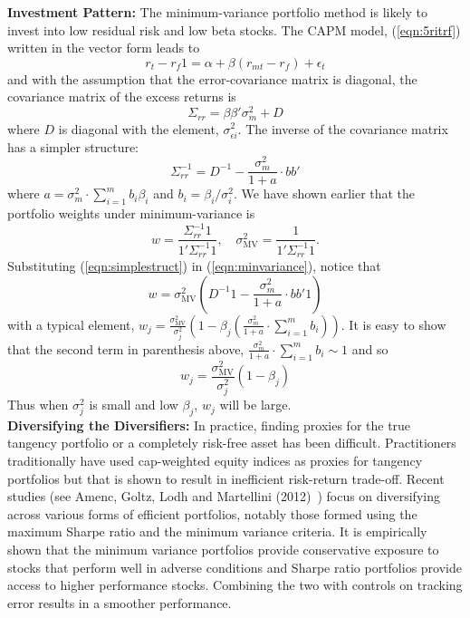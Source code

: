 \noindent \textbf{Investment Pattern:} The minimum-variance portfolio method is likely to invest into low residual risk and low beta stocks. The CAPM model, (\ref{eqn:5ritrf}) written in the vector form leads to
	\begin{equation}\label{eqn:vectorform}
	r_t - r_f 1 = \alpha + \beta(r_{mt} - r_f) + \epsilon_t
	\end{equation}
and with the assumption that the error-covariance matrix is diagonal, the covariance matrix of the excess returns is
	\begin{equation}\label{eqn:Sigmarr}
	\Sigma_{rr}= \beta\beta' \sigma_m^2 + D
	\end{equation}	
where $D$ is diagonal with the element, $\sigma_{\epsilon i}^2$. The inverse of the covariance matrix has a simpler structure:
	\begin{equation}\label{eqn:simplestruct}
	\Sigma_{rr}^{-1}= D^{-1} - \dfrac{\sigma_m^2}{1+a} \cdot bb'
	\end{equation}	
where $a=\sigma_m^2 \cdot \sum_{i=1}^m b_i \beta_i$ and $b_i= \beta_i/\sigma_i^2$. We have shown earlier that the portfolio weights under minimum-variance is
	\begin{equation} \label{eqn:minvariance}
	w= \dfrac{\Sigma_{rr}^{-1} 1}{1' \Sigma_{rr}^{-1} 1}, \quad \sigma_{\text{MV}}^2= \dfrac{1}{1' \Sigma_{rr}^{-1} 1}.
	\end{equation}	
Substituting (\ref{eqn:simplestruct}) in (\ref{eqn:minvariance}), notice that 
	\begin{equation}\label{eqn:wsubtitute}
	w= \sigma_{\text{MV}}^2 \left( D^{-1} 1 - \dfrac{\sigma_m^2}{1+a} \cdot bb' 1\right)
	\end{equation}
with a typical element, $w_j= \frac{\sigma_{\text{MV}}^2}{\sigma_j^2} \left(1 - \beta_j \left(\frac{\sigma_m^2}{1+a} \cdot \sum_{i=1}^m b_i \right)\right)$. It is easy to show that the second term in parenthesis above, $\frac{\sigma_m^2}{1+a} \cdot \sum_{i=1}^m b_i \sim 1$ and so
	\begin{equation}\label{eqn:wsubsecond}
	w_j= \dfrac{\sigma_{\text{MV}}^2}{\sigma_j^2} ( 1- \beta_j)
	\end{equation}
Thus when $\sigma_j^2$ is small and low $\beta_j$, $w_j$ will be large. \\


\noindent\textbf{Diversifying the Diversifiers:} In practice, finding proxies for the true tangency portfolio or a completely risk-free asset has been difficult. Practitioners traditionally have used cap-weighted equity indices as proxies for tangency portfolios but that is shown to result in inefficient risk-return trade-off. Recent studies (see Amenc, Goltz, Lodh and Martellini (2012)~\cite{amencgoltzlodhmart}) focus on diversifying across various forms of efficient portfolios, notably those formed using the maximum Sharpe ratio and the minimum variance criteria. It is empirically shown that the minimum variance portfolios provide conservative exposure to stocks that perform well in adverse conditions and Sharpe ratio portfolios provide access to higher performance stocks. Combining the two with controls on tracking error results in a smoother performance. 


